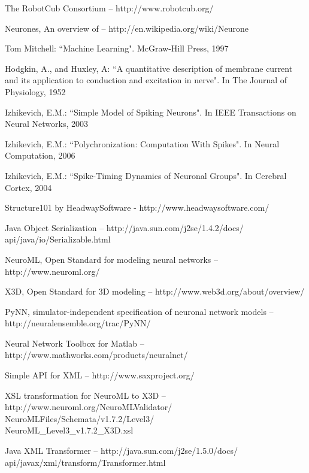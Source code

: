 \documentclass{acm_proc_article-sp}
\begin{document}
\begin{thebibliography}{99}

The RobotCub Consortium {--} http://www.robotcub.org/

Neurones, An overview of {--} http://en.wikipedia.org/wiki/Neurone

Tom Mitchell:
``Machine Learning". McGraw-Hill Press, 1997

Hodgkin, A., and Huxley, A:
``A quantitative description of membrane current and its application to conduction and excitation in nerve". In The Journal of Physiology, 1952

Izhikevich, E.M.:
``Simple Model of Spiking Neurons". In IEEE Transactions on Neural Networks, 2003

Izhikevich, E.M.:
``Polychronization: Computation With Spikes". In Neural Computation, 2006

Izhikevich, E.M.:
``Spike-Timing Dynamics of Neuronal Groups". In Cerebral Cortex, 2004

Structure101 by HeadwaySoftware - http://www.headwaysoftware.com/

Java Object Serialization {--} http://java.sun.com/j2se/1.4.2/docs/\\
api/java/io/Serializable.html

NeuroML, Open Standard for modeling neural networks {--} http://www.neuroml.org/

X3D, Open Standard for 3D modeling {--} http://www.web3d.org/about/overview/

PyNN, simulator-independent specification of neuronal network models {--} http://neuralensemble.org/trac/PyNN/

Neural Network Toolbox for Matlab {--} http://www.mathworks.com/products/neuralnet/

Simple API for XML {--} http://www.saxproject.org/

XSL transformation for NeuroML to X3D {--} http://www.neuroml.org/NeuroMLValidator/\\
NeuroMLFiles/Schemata/v1.7.2/Level3/\\
NeuroML\_Level3\_v1.7.2\_X3D.xsl

Java XML Transformer {--} http://java.sun.com/j2se/1.5.0/docs/\\
api/javax/xml/transform/Transformer.html


\end{thebibliography}
\end{document}
